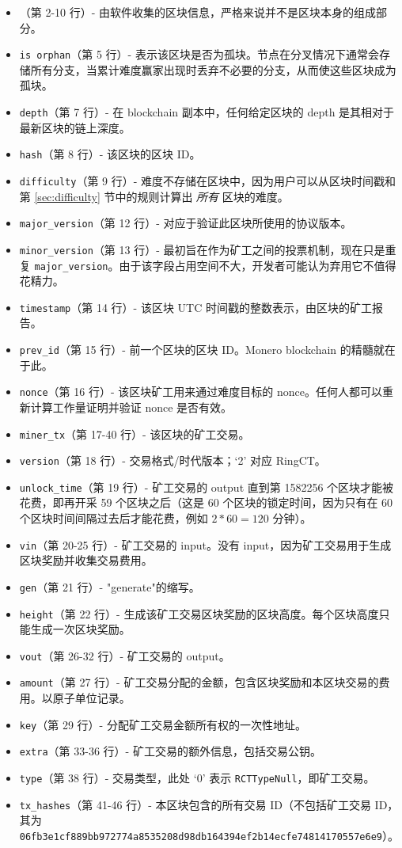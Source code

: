 \begin{appendices}
\begin{itemize}
	\item （第 2-10 行）- 由软件收集的区块信息，严格来说并不是区块本身的组成部分。
    \item {\tt is orphan}（第 5 行）- 表示该区块是否为孤块。节点在分叉情况下通常会存储所有分支，当累计难度赢家出现时丢弃不必要的分支，从而使这些区块成为孤块。
    \item {\tt depth}（第 7 行）- 在 blockchain 副本中，任何给定区块的 depth 是其相对于最新区块的链上深度。
    \item {\tt hash}（第 8 行）- 该区块的区块 ID。
    \item {\tt difficulty}（第 9 行）- 难度不存储在区块中，因为用户可以从区块时间戳和第 \ref{sec:difficulty} 节中的规则计算出 {\em 所有} 区块的难度。
    \item {\tt major\_version}（第 12 行）- 对应于验证此区块所使用的协议版本。
    \item {\tt minor\_version}（第 13 行）- 最初旨在作为矿工之间的投票机制，现在只是重复 {\tt major\_version}。由于该字段占用空间不大，开发者可能认为弃用它不值得花精力。
    \item {\tt timestamp}（第 14 行）- 该区块 UTC 时间戳的整数表示，由区块的矿工报告。
    \item {\tt prev\_id}（第 15 行）- 前一个区块的区块 ID。Monero blockchain 的精髓就在于此。
    \item {\tt nonce}（第 16 行）- 该区块矿工用来通过难度目标的 nonce。任何人都可以重新计算工作量证明并验证 nonce 是否有效。
    \item {\tt miner\_tx}（第 17-40 行）- 该区块的矿工交易。
    \item {\tt version}（第 18 行）- 交易格式/时代版本；`2' 对应 RingCT。
    \item {\tt unlock\_time}（第 19 行）- 矿工交易的 output 直到第 1582256 个区块才能被花费，即再开采 59 个区块之后（这是 60 个区块的锁定时间，因为只有在 60 个区块时间间隔过去后才能花费，例如 $2*60 = 120$ 分钟）。
    \item {\tt vin}（第 20-25 行）- 矿工交易的 input。没有 input，因为矿工交易用于生成区块奖励并收集交易费用。
    \item {\tt gen}（第 21 行）- "generate"的缩写。
    \item {\tt height}（第 22 行）- 生成该矿工交易区块奖励的区块高度。每个区块高度只能生成一次区块奖励。
    \item {\tt vout}（第 26-32 行）- 矿工交易的 output。
    \item {\tt amount}（第 27 行）- 矿工交易分配的金额，包含区块奖励和本区块交易的费用。以原子单位记录。
    \item {\tt key}（第 29 行）- 分配矿工交易金额所有权的一次性地址。
    \item {\tt extra}（第 33-36 行）- 矿工交易的额外信息，包括交易公钥。
    \item {\tt type}（第 38 行）- 交易类型，此处 `0' 表示 {\tt RCTTypeNull}，即矿工交易。
    \item {\tt tx\_hashes}（第 41-46 行）- 本区块包含的所有交易 ID（不包括矿工交易 ID，其为 {\tt 06fb3e1cf889bb972774a8535208d98db164394ef2b14ecfe74814170557e6e9}）。
\end{itemize}





\end{appendices}
